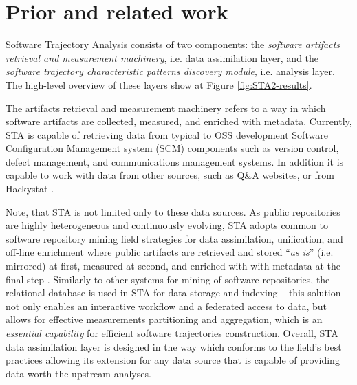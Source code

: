 \chapter{Prior and related work}\label{chapter_background_work}
Software Trajectory Analysis consists of two components: 
the \textit{software artifacts retrieval and measurement machinery}, i.e. data assimilation layer, 
and the \textit{software trajectory characteristic patterns discovery module}, i.e. analysis layer. 
The high-level overview of these layers show at Figure \ref{fig:STA2-results}.

The artifacts retrieval and measurement machinery refers to a way in which software artifacts are 
collected, measured, and enriched with metadata. 
Currently, STA is capable of retrieving data from typical to OSS development Software Configuration 
Management system (SCM) components such as version control, defect management, and communications 
management systems. In addition it is capable to work with data from other sources, such as Q\&A 
websites, or from Hackystat \cite{csdl2-10-09}.

Note, that STA is not limited only to these data sources.
As public repositories are highly heterogeneous and continuously evolving, STA adopts common to software
repository mining field strategies for data assimilation, unification, and off-line enrichment 
where public artifacts are retrieved and stored ``\textit{as is}'' (i.e. mirrored) at first, 
measured at second, and enriched with with metadata at the final step \cite{german04_softchange}.
Similarly to other systems for mining of software repositories, the relational database is used in STA 
for data storage and indexing -- this solution not only enables an interactive workflow and a federated access to 
data, but allows for effective measurements partitioning and aggregation, which is 
an \textit{essential capability} for efficient software trajectories construction.
Overall, STA data assimilation layer is designed in the way which conforms to the field's best practices
allowing its extension for any data source that is capable of providing data worth the upstream analyses.

